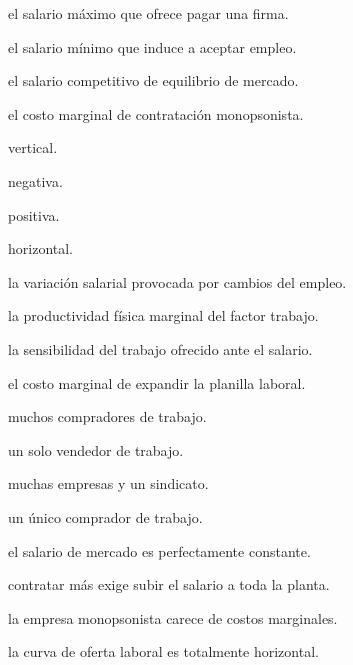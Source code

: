 \begin{opts}
    \item el salario máximo que ofrece pagar una firma.
    \item el salario mínimo que induce a aceptar empleo.
    \item el salario competitivo de equilibrio de mercado.
    \item el costo marginal de contratación monopsonista.
\end{opts}

\begin{opts}
    \item vertical.
    \item negativa.
    \item positiva.
    \item horizontal.
\end{opts}

\begin{opts}
    \item la variación salarial provocada por cambios del empleo.
    \item la productividad física marginal del factor trabajo.
    \item la sensibilidad del trabajo ofrecido ante el salario.
    \item el costo marginal de expandir la planilla laboral.
\end{opts}

\begin{opts}
    \item muchos compradores de trabajo.
    \item un solo vendedor de trabajo.
    \item muchas empresas y un sindicato.
    \item un único comprador de trabajo.
\end{opts}

\begin{opts}
    \item el salario de mercado es perfectamente constante.
    \item contratar más exige subir el salario a toda la planta.
    \item la empresa monopsonista carece de costos marginales.
    \item la curva de oferta laboral es totalmente horizontal.
\end{opts}

